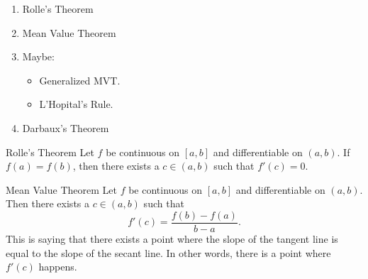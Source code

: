 \begin{enumerate}
    \item Rolle's Theorem
    \item Mean Value Theorem
    \item Maybe:
    \begin{itemize}
        \item Generalized MVT.
        \item L'Hopital's Rule.
    \end{itemize}
    \item Darbaux's Theorem
\end{enumerate}

\begin{ntheorem}
    {Rolle's Theorem} Let \(f\) be continuous on \([a, b]\) and differentiable on \((a, b)\). If \(f(a) = f(b)\), then there exists a \(c \in (a, b)\) such that \(f'(c) = 0\).
\end{ntheorem}


\begin{ntheorem}
    {Mean Value Theorem} Let \(f\) be continuous on \([a, b]\) and differentiable on \((a, b)\). Then there exists a \(c \in (a, b)\) such that
    \[
        f'(c) = \frac{f(b) - f(a)}{b - a}.
    \]
    This is saying that there exists a point where the slope of the tangent line is equal to the slope of the secant line. In other words, there is a point where \(f'(c)\) happens.
\end{ntheorem}

